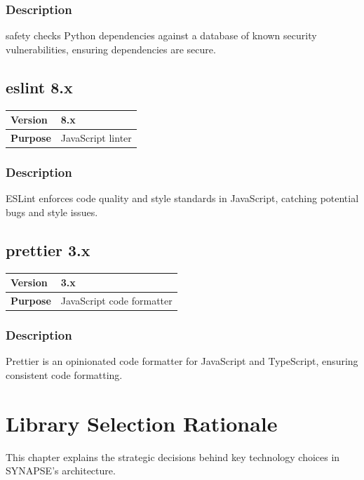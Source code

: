 \documentclass[12pt,a4paper]{report}
\begin{document}
\subsection{Description}

safety checks Python dependencies against a database of known security vulnerabilities, ensuring dependencies are secure.

\section{eslint 8.x}

\begin{tabular}{|p{4cm}|p{10cm}|}
\hline
\textbf{Version} & 8.x \\
\hline
\textbf{Purpose} & JavaScript linter \\
\hline
\end{tabular}

\subsection{Description}

ESLint enforces code quality and style standards in JavaScript, catching potential bugs and style issues.

\section{prettier 3.x}

\begin{tabular}{|p{4cm}|p{10cm}|}
\hline
\textbf{Version} & 3.x \\
\hline
\textbf{Purpose} & JavaScript code formatter \\
\hline
\end{tabular}

\subsection{Description}

Prettier is an opinionated code formatter for JavaScript and TypeScript, ensuring consistent code formatting.

\chapter{Library Selection Rationale}

This chapter explains the strategic decisions behind key technology choices in SYNAPSE's architecture.
\end{document}
